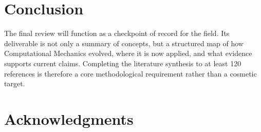 \documentclass[11pt,twocolumn]{article}
\newcommand{\TargetRefs}{120}
\begin{document}
\section{Conclusion}
\label{sec:conclusion}

The final review will function as a checkpoint of record for the field.
Its deliverable is not only a summary of concepts, but a structured map of how Computational Mechanics evolved, where it is now applied, and what evidence supports current claims.
Completing the literature synthesis to at least \TargetRefs{} references is therefore a core methodological requirement rather than a cosmetic target.

\section*{Acknowledgments}





\end{document}
